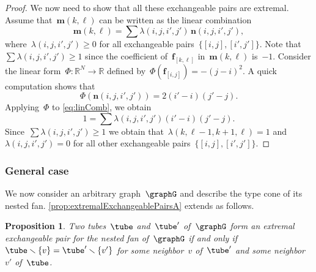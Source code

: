 \documentclass{amsart}
\newtheorem{proposition}[theorem]{Proposition}
\theoremstyle{definition}
\newcommand{\R}{\mathbb{R}} %
\renewcommand{\b}[1]{{\boldsymbol{#1}}} %
\newcommand{\ssm}{\smallsetminus} %
\newcommand{\symdif}{\,\triangle\,} %
\begin{document}
\begin{proof}
We now need to show that all these exchangeable pairs are extremal.
Assume that~$\b{m}(k,\ell)$ can be written as the linear combination
\begin{equation}
\label{eq:linComb}
\b{m}(k,\ell) = \sum \lambda(i,j,i',j') \, \b{n}(i,j,i',j'),
\end{equation}
where~$\lambda(i,j,i',j') \ge 0$ for all exchangeable pairs~$\{[i,j], [i',j']\}$.
Note that~$\sum \lambda(i,j,i',j') \ge 1$ since the coefficient of~$\b{f}_{[k,\ell]}$ in~$\b{m}(k,\ell)$ is~$-1$.
Consider the linear form~$\Phi: \R^N \to \R$ defined by~$\Phi(\b{f}_{[i,j]}) = -(j-i)^2$.
A quick computation shows that
\[
\Phi(\b{n}(i,j,i',j')) = 2(i'-i)(j'-j).
\]
Applying~$\Phi$ to \cref{eq:linComb}, we obtain
\[
1 = \sum \lambda(i,j,i',j')(i'-i)(j'-j).
\]
Since~$\sum \lambda(i,j,i',j') \ge 1$ we obtain that~$\lambda(k,\ell-1,k+1,\ell) = 1$ and~$\lambda(i,j,i',j') = 0$ for all other exchangeable pairs~$\{[i,j], [i',j']\}$.
\end{proof}

\subsubsection{General case}

We now consider an arbitrary graph~$\graphG$ and describe the type cone of its nested fan.
\cref{prop:extremalExchangeablePairsA} extends as follows.

\begin{proposition}
\label{prop:extremalExchangeablePairsGA}
Two tubes~$\tube$ and~$\tube'$ of~$\graphG$ form an extremal exchangeable pair for the nested fan of~$\graphG$ if and only if~${\tube \ssm \{v\} = \tube' \ssm \{v'\}}$ for some neighbor~$v$ of~$\tube'$ and some neighbor~$v'$ of~$\tube$.
\end{proposition}
\end{document}
